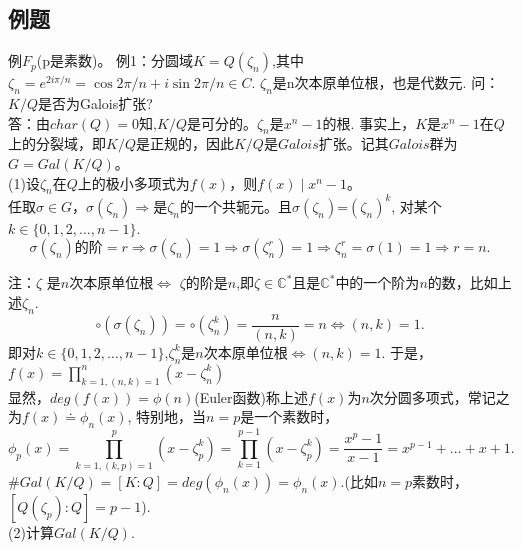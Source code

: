 \documentclass[UTF8]{article}
\begin{document}
\subsection{例题}
例$F_{p}$(p是素数)。
例1：分圆域$K=Q(\zeta_n)$,其中$\zeta_n=e^{2i\pi/n}=\cos{2\pi/n}+i\sin{2\pi/n}\in C$.
$\zeta_n$是n次本原单位根，也是代数元.
问：$K/Q$是否为Galois扩张?\\
答：由$char(Q)=0$知,$K/Q$是可分的。$\zeta_n$是$x^n-1$的根.
事实上，$K$是$x^n-1$在$Q$上的分裂域，即$K/Q$是正规的，因此$K/Q$是$Galois$扩张。记其$Galois$群为$G=Gal(K/Q)$。\\


(1)设$\zeta_n$在$Q$上的极小多项式为$f(x)$，则$f(x)\mid x^n-1$。\\
任取$\sigma\in G$，$\sigma(\zeta_n)$$\Rightarrow$是$\zeta_n$的一个共轭元。且$\sigma(\zeta_n)$=$(\zeta_n)^{k}$, 对某个$k\in\{0,1,2,\ldots,n-1\}$.
$$\sigma(\zeta_n)\text{的阶}=r\Rightarrow\sigma(\zeta_n)=1\Rightarrow\sigma(\zeta_n^r)=1\Rightarrow\zeta_n^r=\sigma(1)=1\Rightarrow r=n.$$

注：$\zeta$ 是$n$次本原单位根$\Leftrightarrow$ $\zeta$的阶是$n$,即$\zeta\in \mathbb{C}^{*}$且是$\mathbb{C}^{*}$中的一个阶为$n$的数，比如上述$\zeta_n$.\\
$$\circ(\sigma(\zeta_n))=\circ(\zeta_n^k)=\frac{n}{(n,k)}=n\Leftrightarrow(n,k)=1.$$
即对$k\in\{0,1,2,\ldots,n-1\}$,$\zeta_n^k$是$n$次本原单位根$\Leftrightarrow$$(n,k)=1$.
于是，$f(x)=\prod \limits_{k=1,(n,k)=1}^n(x-\zeta_n^k) $\\%
显然，$deg(f(x))=\phi(n)$(Euler函数)称上述$f(x)$为$n$次分圆多项式，常记之为$f(x)\doteq \phi_n(x)$,
特别地，当$n=p$是一个素数时，
$$\phi_p(x)=\prod \limits_{k=1,(k,p)=1}^p(x-\zeta_p^k)=\prod\limits_{k=1}^{p-1}(x-\zeta_p^k)=\frac{x^{p}-1}{x-1}=x^{p-1}+\ldots +x+1.$$
$\#Gal(K/Q)=[K:Q]=deg(\phi_n(x))=\phi_n(x).$(比如$n=p$素数时，$[Q(\zeta_p):Q]=p-1$).\\


(2)计算$Gal(K/Q)$.
\end{document}
